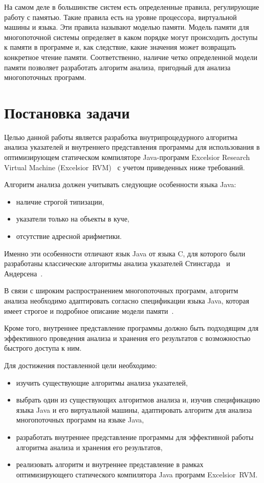 \documentclass[14pt,titlepage]{extarticle}
\newcommand{\eng}[1]{{\English#1}}
\let\oldsection\section
\renewcommand{\section}{\newpage\oldsection}
\newcommand{\java}{\eng{Java}\xspace}
\begin{document}
      На самом деле в большинстве систем есть определенные правила,
      регулирующие работу с памятью. Такие правила есть на уровне процессора,
      виртуальной машины и языка. Эти правила называют моделью памяти.
      Модель памяти для многопоточной системы определяет в каком
      порядке могут происходить доступы к памяти в программе и, как следствие,
      какие значения может возвращать конкретное чтение памяти. Соответственно,
      наличие четко определенной модели памяти позволяет разработать алгоритм
      анализа, пригодный для анализа многопоточных программ.

  \section{Постановка задачи}

    Целью данной работы является разработка внутрипроцедурного алгоритма
    анализа указателей и внутреннего представления программы для использования
    в оптимизирующем статическом компиляторе \java-программ \eng{Excelsior
    Research Virtual Machine (Excelsior~RVM)}~\cite{excelsior_jet} с учетом
    приведенных ниже требований.

    Алгоритм анализа должен учитывать следующие особенности языка \java:
    \begin{itemize}
      \item наличие строгой типизации,
      \item указатели только на объекты в куче,
      \item отсутствие адресной арифметики.
    \end{itemize}
    Именно эти особенности отличают язык \java от языка C, для которого были
    разработаны классические алгоритмы анализа указателей
    Стинсгарда~\cite{steensgaard} и Андерсена~\cite{andersen}.

    В связи с широким распространением многопоточных программ, алгоритм анализа
    необходимо адаптировать согласно спецификации языка \java, которая имеет
    строгое и подробное описание модели памяти~\cite{manson_jmm}.

    Кроме того, внутреннее представление программы должно быть подходящим для
    эффективного проведения анализа и хранения его результатов с возможностью
    быстрого доступа к ним.

    Для достижения поставленной цели необходимо:
    \begin{itemize}
      \item изучить существующие алгоритмы анализа указателей,
      \item выбрать один из существующих алгоритмов анализа и, изучив
            спецификацию языка \java и его виртуальной машины, адаптировать
            алгоритм для анализа многопоточных программ на языке \java,
      \item разработать внутреннее представление программы для эффективной
            работы алгоритма анализа и хранения его результатов,
      \item реализовать алгоритм и внутреннее представление в рамках
            оптимизирующего статического компилятора \java программ
            \eng{Excelsior~RVM}.
    \end{itemize}
\end{document}
